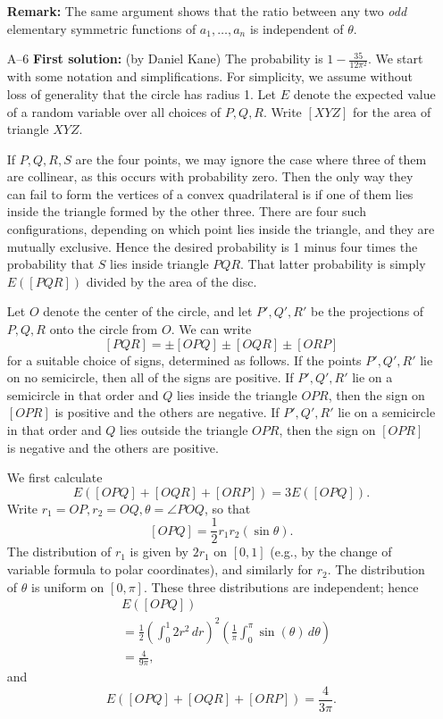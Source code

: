 \documentclass[amssymb,twocolumn,pra,10pt,aps]{revtex4-1}
\begin{document}
\begin{itemize}
\textbf{Remark:} The same argument shows that the ratio between
any two \emph{odd} elementary
symmetric functions of $a_1, \dots, a_n$ is independent
of $\theta$.

\item[A--6]
\textbf{First solution:}
(by Daniel Kane)
The probability is $1 - \frac{35}{12\pi^2}$.
We start with some notation and simplifications.
For simplicity, we
assume without loss of generality that the circle has radius 1.
Let $E$ denote the expected value of a random variable over all
choices of $P,Q,R$.
Write $[XYZ]$ for the area of triangle $XYZ$.

If $P,Q,R,S$ are the four points, we may ignore the case where three
of them are collinear, as this occurs with probability zero. Then the only
way they can fail to form the vertices of a convex quadrilateral is if one
of them lies inside the triangle formed by the other three. There are four
such configurations, depending on which point lies inside the triangle, and
they are mutually exclusive. Hence the desired probability is 1 minus
four times the probability that $S$ lies inside triangle $PQR$. That latter
probability is simply $E([PQR])$ divided by the area of
the disc.

Let $O$ denote the center of the circle,
and let $P',Q',R'$ be the projections of $P,Q,R$ onto the circle from $O$.
We can write
\[
[PQR] = \pm [OPQ] \pm [OQR] \pm [ORP]
\]
for a suitable choice of signs, determined as follows. If the points
$P',Q',R'$ lie on no semicircle, then all of the signs are positive.
If $P',Q',R'$ lie on a semicircle in that order and
$Q$ lies inside the triangle $OPR$, then the sign on $[OPR]$ is
positive and the others are negative.
If $P',Q',R'$ lie on a semicircle in that order and
$Q$ lies outside the triangle $OPR$, then the sign on $[OPR]$ is
negative and the others are positive.

We first calculate
\[
E([OPQ] + [OQR] + [ORP]) = 3 E([OPQ]).
\]
Write $r_1 = OP, r_2 = OQ, \theta = \angle POQ$, so that
\[
[OPQ] = \frac{1}{2} r_1 r_2 (\sin \theta).
\]
The distribution of $r_1$ is given by $2r_1$ on $[0,1]$
(e.g., by the change of variable formula to polar coordinates),
and similarly for $r_2$.
The distribution of $\theta$ is uniform on $[0,\pi]$.
These three distributions are independent; hence
\begin{align*}
& E([OPQ]) \\
&= \frac{1}{2} \left( \int_0^{1} 2r^2\,dr \right)^2
\left( \frac{1}{\pi} \int_0^\pi \sin (\theta)\,d\theta \right) \\
&= \frac{4}{9 \pi},
\end{align*}
and
\[
E([OPQ] + [OQR] + [ORP]) = \frac{4}{3 \pi}.
\]


\end{itemize}
\end{document}
